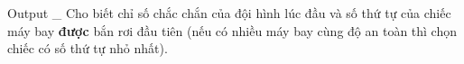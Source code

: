 Output
\_ Cho biết   chỉ số chắc chắn   của đội hình lúc đầu và số thứ tự của chiếc máy bay   \textbf{    được   }bắn rơi đầu tiên   (nếu có nhiều máy bay cùng độ an toàn thì chọn chiếc có số thứ tự nhỏ nhất).